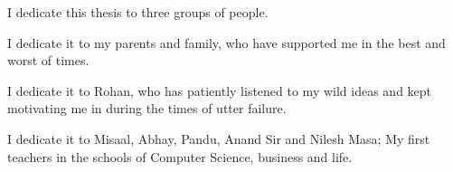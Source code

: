 \leavevmode\vfill
I dedicate this thesis to three groups of people.

I dedicate it to my parents and family, who have supported me in the best and worst of times. 

I dedicate it to Rohan, who has patiently listened to my wild ideas and kept motivating me in during the times of utter failure. 

I dedicate it to Misaal, Abhay, Pandu, Anand Sir and Nilesh Masa; My first teachers in the schools of Computer Science, business and life. 
\vfill
